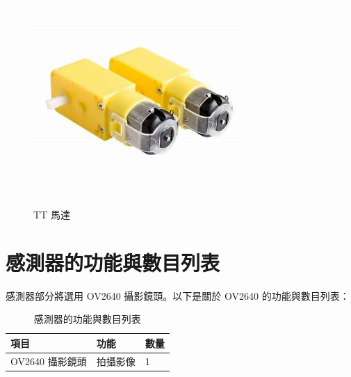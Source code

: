 \documentclass[12pt]{article}       %
\begin{document}
\begin{figure}[H]
    \centering
    \includegraphics[width=0.7\textwidth]{MxzONoG.png}     %
    \caption{TT 馬達\cite{JustMakeIt_TT_Motor}}    %
    \label{fig:MxzONoG}    %
\end{figure}


\section{\centering 感測器的功能與數目列表}

\hspace{2em}感測器部分將選用 OV2640 攝影鏡頭。以下是關於 OV2640 的功能與數目列表：
\begin{table}[H]
    \centering
    \caption{感測器的功能與數目列表}
    \vspace{6pt} %
    \label{tab:OV26401}
    \begin{tabular}{lll}
        \toprule
        \textbf{項目} & \textbf{功能} & \textbf{數量}\\
        \midrule
        OV2640 攝影鏡頭  & 拍攝影像 &1\\
        \bottomrule
    \end{tabular}
\end{table}
\end{document}
